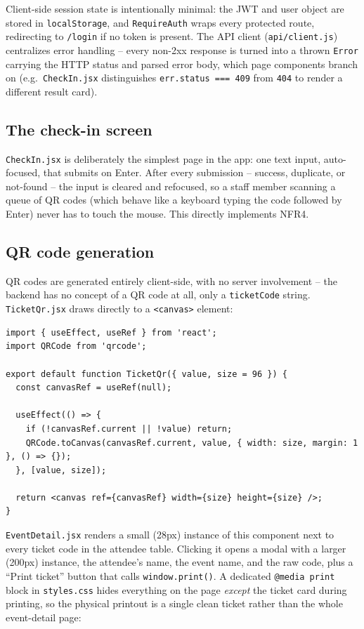 ﻿\documentclass[11pt,letterpaper]{report}
\newcommand{\code}[1]{\lstinline[breaklines=true]{#1}}
\begin{document}
Client-side session state is intentionally minimal: the JWT and user
object are stored in \code{localStorage}, and \code{RequireAuth}
wraps every protected route, redirecting to \code{/login} if no token
is present. The API client (\code{api/client.js}) centralizes error
handling -- every non-2xx response is turned into a thrown
\code{Error} carrying the HTTP status and parsed error body, which
page components branch on (e.g.\ \code{CheckIn.jsx} distinguishes
\code{err.status === 409} from \code{404} to render a different
result card).

\subsection{The check-in screen}

\code{CheckIn.jsx} is deliberately the simplest page in the app: one
text input, auto-focused, that submits on Enter. After every
submission -- success, duplicate, or not-found -- the input is cleared
and refocused, so a staff member scanning a queue of QR codes (which
behave like a keyboard typing the code followed by Enter) never has to
touch the mouse. This directly implements NFR4.

\subsection{QR code generation}
\label{sec:qr-impl}

QR codes are generated entirely client-side, with no server
involvement -- the backend has no concept of a QR code at all, only a
\code{ticketCode} string. \code{TicketQr.jsx} draws directly to a
\code{<canvas>} element:

\begin{lstlisting}[caption={components/TicketQr.jsx}]
import { useEffect, useRef } from 'react';
import QRCode from 'qrcode';

export default function TicketQr({ value, size = 96 }) {
  const canvasRef = useRef(null);

  useEffect(() => {
    if (!canvasRef.current || !value) return;
    QRCode.toCanvas(canvasRef.current, value, { width: size, margin: 1 }, () => {});
  }, [value, size]);

  return <canvas ref={canvasRef} width={size} height={size} />;
}
\end{lstlisting}

\code{EventDetail.jsx} renders a small (28px) instance of this
component next to every ticket code in the attendee table. Clicking it
opens a modal with a larger (200px) instance, the attendee's name, the
event name, and the raw code, plus a ``Print ticket'' button that
calls \code{window.print()}. A dedicated \code{@media print} block in
\code{styles.css} hides everything on the page \emph{except} the
ticket card during printing, so the physical printout is a single
clean ticket rather than the whole event-detail page:
\end{document}
